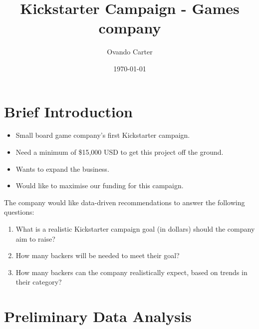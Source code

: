 \documentclass{article}
\begin{document}
\frenchspacing




\title{Kickstarter Campaign - Games company}

\date{\today}

\author{Ovando Carter}

\maketitle

\newpage

\tableofcontents








\maketitle

\clearpage

\section{Brief Introduction}



\begin{itemize}
\item Small board game company’s first Kickstarter campaign.
\item Need a minimum of \$15,000 USD to get this project off the ground.
\item Wants to expand the business.
\item Would like to maximise our funding for this campaign.
\end{itemize}

\noindent The company would like data-driven recommendations to answer the following questions: 

\begin{enumerate}
\item What is a realistic Kickstarter campaign goal (in dollars) should the company aim to raise?
\item How many backers will be needed to meet their goal?
\item How many backers can the company realistically expect, based on trends in their category?
\end{enumerate}



\section{Preliminary Data Analysis}
\end{document}
